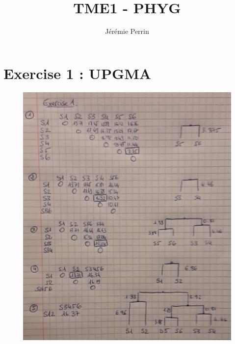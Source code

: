 \documentclass[]{article}
\title{TME1 - PHYG}
\author{Jérémie Perrin}
\begin{document}
\maketitle

\section{Exercise 1 : UPGMA}
\begin{figure}[h]
	\includegraphics*[width = \linewidth, height =0.7\textheight]{ex1.jpg}
\end{figure}
\end{document}
